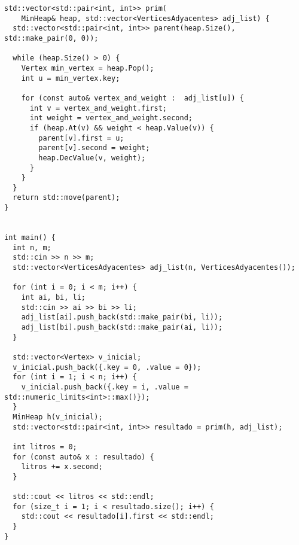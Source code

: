 \begin{lstlisting}[frame=single]
std::vector<std::pair<int, int>> prim(
    MinHeap& heap, std::vector<VerticesAdyacentes> adj_list) {
  std::vector<std::pair<int, int>> parent(heap.Size(), std::make_pair(0, 0));

  while (heap.Size() > 0) {
    Vertex min_vertex = heap.Pop();
    int u = min_vertex.key;

    for (const auto& vertex_and_weight :  adj_list[u]) {
      int v = vertex_and_weight.first;
      int weight = vertex_and_weight.second;
      if (heap.At(v) && weight < heap.Value(v)) {
        parent[v].first = u;
        parent[v].second = weight;
        heap.DecValue(v, weight);
      }
    }
  }
  return std::move(parent);
}


int main() {
  int n, m;
  std::cin >> n >> m;
  std::vector<VerticesAdyacentes> adj_list(n, VerticesAdyacentes());

  for (int i = 0; i < m; i++) {
    int ai, bi, li;
    std::cin >> ai >> bi >> li;
    adj_list[ai].push_back(std::make_pair(bi, li));
    adj_list[bi].push_back(std::make_pair(ai, li));
  }

  std::vector<Vertex> v_inicial;
  v_inicial.push_back({.key = 0, .value = 0});
  for (int i = 1; i < n; i++) {
    v_inicial.push_back({.key = i, .value = std::numeric_limits<int>::max()});
  }
  MinHeap h(v_inicial);  
  std::vector<std::pair<int, int>> resultado = prim(h, adj_list);

  int litros = 0;
  for (const auto& x : resultado) {
    litros += x.second;
  }

  std::cout << litros << std::endl;
  for (size_t i = 1; i < resultado.size(); i++) {
    std::cout << resultado[i].first << std::endl;
  }
}
\end{lstlisting}


